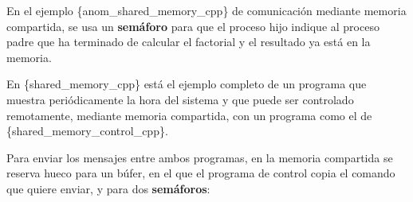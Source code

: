 En el ejemplo \{anom\_shared\_memory\_cpp\} de comunicación mediante
memoria compartida, se usa un \textbf{semáforo} para que el proceso hijo
indique al proceso padre que ha terminado de calcular el factorial y el
resultado ya está en la memoria.

En \{shared\_memory\_cpp\} está el ejemplo completo de un programa que
muestra periódicamente la hora del sistema y que puede ser controlado
remotamente, mediante memoria compartida, con un programa como el de
\{shared\_memory\_control\_cpp\}.

Para enviar los mensajes entre ambos programas, en la memoria compartida
se reserva hueco para un búfer, en el que el programa de control copia
el comando que quiere enviar, y para dos \textbf{semáforos}:

\begin{Shaded}
\begin{Highlighting}[]
\OperatorTok{\{}
\OperatorTok{;} 
\OperatorTok{;} 
    \OperatorTok{[}\OperatorTok{];}
\OperatorTok{\};}
\end{Highlighting}
\end{Shaded}


